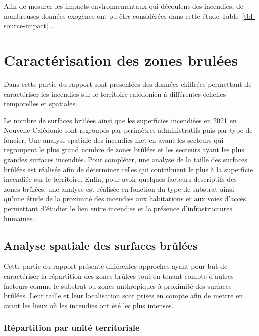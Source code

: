 \documentclass[
  11pt,
  letterpaper,
]{scrreprt}
\begin{document}
Afin de mesurer les impacts environnementaux qui découlent des
incendies, de nombreuses données exogènes ont pu être considérées dans
cette étude Table~\ref{tbl-source-impact} .


\chapter{Caractérisation des zones
brulées}\label{caractuxe9risation-des-zones-bruluxe9es}

Dans cette partie du rapport sont présentées des données chiffrées
permettant de caractériser les incendies sur le territoire calédonien à
différentes échelles temporelles et spatiales.

Le nombre de surfaces brûlées ainsi que les superficies incendiées en
2021 en Nouvelle-Calédonie sont regroupés par perimètres administratifs
puis par type de foncier. Une analyse spatiale des incendies met en
avant les secteurs qui regroupent le plus grand nombre de zones brûlées
et les secteurs ayant les plus grandes surfaces incendiés. Pour
compléter, une analyse de la taille des surfaces brûlées est réalisée
afin de déterminer celles qui contribuent le plus à la superficie
incendiée sur le territoire. Enfin, pour avoir quelques facteurs
descriptifs des zones brûlées, une analyse est réalisée en fonction du
type de substrat ainsi qu'une étude de la proximité des incendies aux
habitations et aux voies d'accès permettant d'étudier le lien entre
incendies et la présence d'infrastructures humaines.

\section{Analyse spatiale des surfaces
brûlées}\label{analyse-spatiale-des-surfaces-bruxfbluxe9es}

Cette partie du rapport présente différentes approches ayant pour but de
caractériser la répartition des zones brûlées tout en tenant compte
d'autres facteurs comme le substrat ou zones anthropiques à proximité
des surfaces brûlées. Leur taille et leur localisation sont prises en
compte afin de mettre en avant les lieux où les incendies ont été les
plus intenses.

\subsection{Répartition par unité
territoriale}\label{ruxe9partition-par-unituxe9-territoriale}
\end{document}
